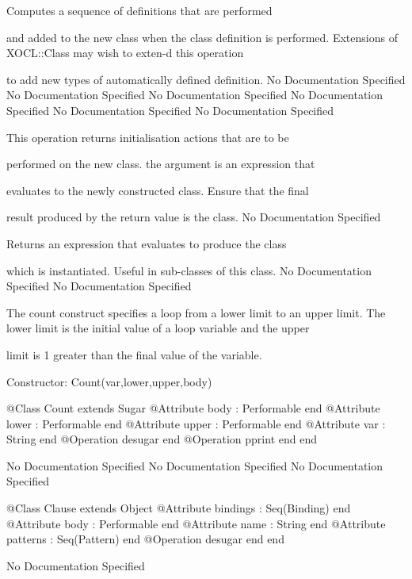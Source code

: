          Computes a sequence of definitions that are performed

         and added to the new class when the class definition is performed.
         Extensions of XOCL::Class may wish to exten-d this operation

         to add new types of automatically defined definition.
No Documentation Specified
No Documentation Specified
No Documentation Specified
No Documentation Specified
No Documentation Specified
No Documentation Specified

         This operation returns initialisation actions that are to be

         performed on the new class. the argument is an expression that

         evaluates to the newly constructed class. Ensure that the final

         result produced by the return value is the class.
No Documentation Specified

         Returns an expression that evaluates to produce the class

         which is instantiated. Useful in sub-classes of this class.
No Documentation Specified
No Documentation Specified

      The count construct specifies a loop from a lower limit to an upper limit.
      The lower limit is the initial value of a loop variable and the upper

      limit is 1 greater than the final value of the variable.
      
      Constructor: Count(var,lower,upper,body)
\begin{Interface}
@Class Count extends Sugar
  @Attribute body : Performable end
  @Attribute lower : Performable end
  @Attribute upper : Performable end
  @Attribute var : String end
  @Operation desugar end
  @Operation pprint end
end
\end{Interface}
No Documentation Specified
No Documentation Specified
No Documentation Specified
\begin{Interface}
@Class Clause extends Object
  @Attribute bindings : Seq(Binding) end
  @Attribute body : Performable end
  @Attribute name : String end
  @Attribute patterns : Seq(Pattern) end
  @Operation desugar end
end
\end{Interface}
No Documentation Specified

